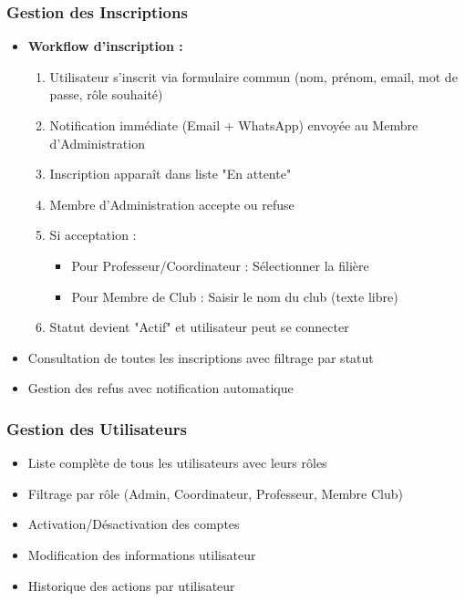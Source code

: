 \documentclass[12pt,a4paper]{article}
\begin{document}
\subsubsection{Gestion des Inscriptions}
\begin{itemize}
    \item \textbf{Workflow d'inscription :}
    \begin{enumerate}
        \item Utilisateur s'inscrit via formulaire commun (nom, prénom, email, mot de passe, rôle souhaité)
        \item Notification immédiate (Email + WhatsApp) envoyée au Membre d'Administration
        \item Inscription apparaît dans liste "En attente"
        \item Membre d'Administration accepte ou refuse
        \item Si acceptation :
        \begin{itemize}
            \item Pour Professeur/Coordinateur : Sélectionner la filière
            \item Pour Membre de Club : Saisir le nom du club (texte libre)
        \end{itemize}
        \item Statut devient "Actif" et utilisateur peut se connecter
    \end{enumerate}
    \item Consultation de toutes les inscriptions avec filtrage par statut
    \item Gestion des refus avec notification automatique
\end{itemize}

\subsubsection{Gestion des Utilisateurs}
\begin{itemize}
    \item Liste complète de tous les utilisateurs avec leurs rôles
    \item Filtrage par rôle (Admin, Coordinateur, Professeur, Membre Club)
    \item Activation/Désactivation des comptes
    \item Modification des informations utilisateur
    \item Historique des actions par utilisateur
\end{itemize}
\end{document}
